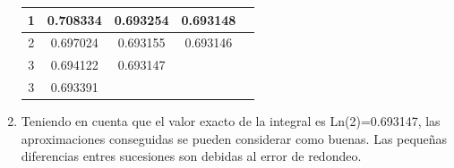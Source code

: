 \documentclass[journal,transmag]{IEEEtran}
\theoremstyle{mytheoremstyle}
\theoremstyle{mytheoremstyle}
\theoremstyle{myproblemstyle}
\begin{document}
\begin{enumerate}
\begin{center}
\begin{table}[h]
\begin{center}
\begin{tabular}{| c | c | c | c | c |}
                1 & 0.708334  & 0.693254  & 0.693148 & \\  \hline
                2 & 0.697024  & 0.693155  & 0.693146 &\\ \hline
                3 & 0.694122 & 0.693147  & &\\ \hline
                3 & 0.693391 &  & &\\ \hline
                \end{tabular}
                \label{tab:EjemploEjercicio1}
            \end{center}
                \end{table}
    \end{center}
    \item   Teniendo en cuenta que el valor exacto de la integral es Ln(2)=0.693147, las
    aproximaciones conseguidas se pueden considerar como buenas. Las pequeñas
    diferencias entres sucesiones son debidas al error de redondeo. 
    \end{enumerate}
\end{document}
